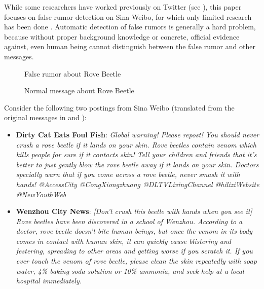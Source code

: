 While some researchers have worked previously on
Twitter (see ),
this paper focuses on false rumor detection on
Sina Weibo, for which only limited research has been done
\cite{yang2012automatic,sun2013detecting,bao2013new}.
Automatic detection of false rumors is generally a hard problem, because
without proper background knowledge or concrete,
official evidence against, even human being cannot distinguish
between the false rumor and other messages.
%
%

\begin{figure}[th]
\centering
{}
\caption{False rumor about Rove Beetle}
\label{fig:beetle-rumor}
\vspace*{2mm}
\caption{Normal message about Rove Beetle}
\label{fig:beetle-truth}
\end{figure}

Consider the following two postings from Sina Weibo (translated from
the original messages in  and ):
\begin{itemize}
\small
\item {\bf Dirty Cat Eats Foul Fish}: \textit{Global warning! Please repost!
You should never crush a rove beetle if it lands on your skin.
Rove beetles contain venom which kills people for sure if it 
contacts skin! Tell your children and friends that it's better
to just gently blow the rove beetle away if it lands on your skin. 
Doctors specially warn that if you come across
a rove beetle, never smash it with hands! @AccessCity @CongXiongzhuang
@DLTVLivingChannel @hiliziWebsite @NewYouthWeb}
\item {\bf Wenzhou City News}: \textit{[Don't crush this beetle with 
hands when you see it] Rove beetles have been discovered
in a school of Wenzhou. According to a doctor, rove beetle doesn't bite
human beings, but once the venom in its body comes in contact with human skin,
it can quickly cause blistering and festering, spreading to other areas and
getting worse if you scratch it. 
If you ever touch the venom of rove beetle, please clean the skin repeatedly
with soap water, 4\% baking soda solution or 10\% ammonia, and seek help at
a local hospital immediately.}
\end{itemize}


